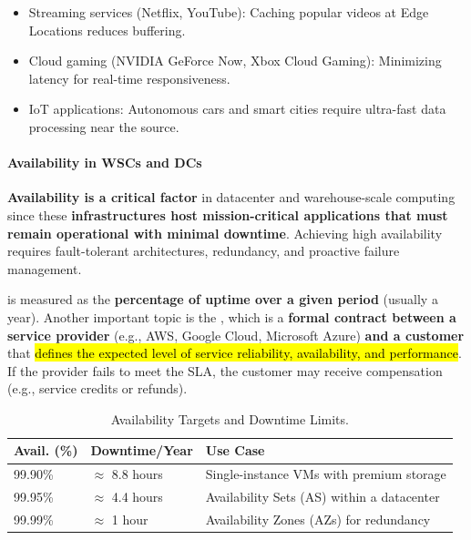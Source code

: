 \begin{examplebox}
    \begin{itemize}
        \item Streaming services (Netflix, YouTube): Caching popular videos at Edge Locations reduces buffering.
        \item Cloud gaming (NVIDIA GeForce Now, Xbox Cloud Gaming): Minimizing latency for real-time responsiveness.
        \item IoT applications: Autonomous cars and smart cities require ultra-fast data processing near the source.
    \end{itemize}
\end{examplebox}

\hfill

\longline

\hfill

\paragraph{Availability in WSCs and DCs}

\textbf{Availability is a critical factor} in datacenter and warehouse-scale computing since these \textbf{infrastructures host mission-critical applications that must remain operational with minimal downtime}. Achieving high availability requires fault-tolerant architectures, redundancy, and proactive failure management.

\highspace
{} is measured as the \textbf{percentage of uptime over a given period} (usually a year). Another important topic is the , which is a \textbf{formal contract between a service provider} (e.g., AWS, Google Cloud, Microsoft Azure) \textbf{and a customer} that \hl{defines the expected level of service reliability, availability, and performance}. If the provider fails to meet the SLA, the customer may receive compensation (e.g., service credits or refunds).

\begin{table}[!htp]
    \centering
    \begin{tabular}{@{} l | l | l @{}}
        \toprule
        \textbf{Avail. (\%)} & \textbf{Downtime/Year} & \textbf{Use Case} \\
        \midrule
        99.90\% & $\approx$ 8.8 hours   & Single-instance VMs with premium storage \\ [.3em]
        99.95\% & $\approx$ 4.4 hours   & Availability Sets (AS) within a datacenter \\ [.3em]
        99.99\% & $\approx$ 1 hour      & Availability Zones (AZs) for redundancy \\
        \bottomrule
    \end{tabular}
    \caption{Availability Targets and Downtime Limits.}
\end{table}

